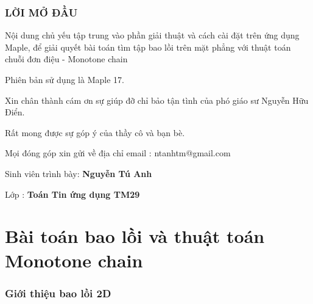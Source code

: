 \documentclass[12pt]{article}
\begin{document}
  
  \newpage
  \vspace*{2cm}
  \section*{LỜI MỞ ĐẦU} 
    Nội dung chủ yếu tập trung vào phần giải thuật và cách cài đặt trên ứng 
    dụng Maple, để giải quyết bài toán tìm tập bao lồi  
    trên mặt phẳng với thuật toán chuỗi đơn điệu - Monotone chain  
    
    Phiên bản sử dụng là Maple 17.
    
    Xin chân thành cám ơn sự giúp đỡ chỉ bảo tận tình của phó giáo sư Nguyễn Hữu 
    Điển. 

    Rất mong được sự góp ý của thầy cô và bạn bè. 
    
    Mọi đóng góp xin gửi về địa chỉ email : ntanhtm@gmail.com
    
    Sinh viên trình bày: \textbf{Nguyễn Tú Anh }

    Lớp : \textbf{Toán Tin ứng dụng TM29 }
  \newpage
  \tableofcontents
  \newpage
  \part {Bài toán bao lồi và thuật toán Monotone chain}
    \section{Giới thiệu bao lồi 2D}
\end{document}
